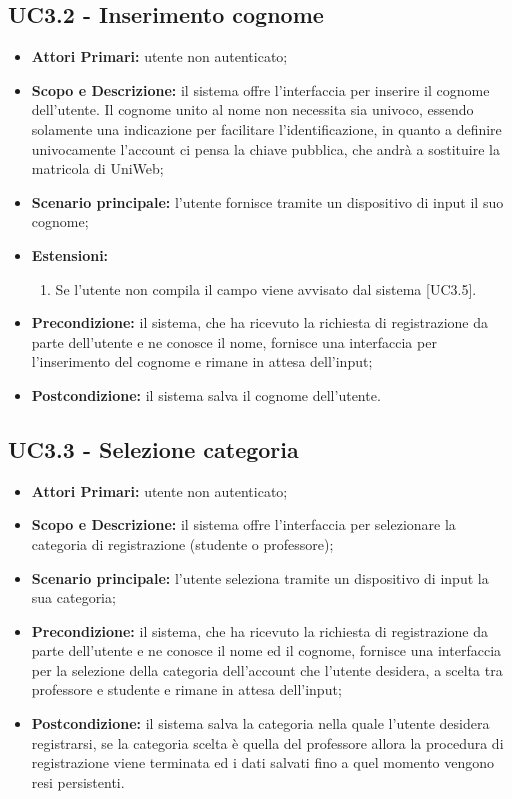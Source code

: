 \documentclass[AnalisiDeiRequisiti.tex]{subfiles}
\begin{document}
\subsection{UC3.2 - Inserimento cognome}
\begin{itemize}
	\item \textbf{Attori Primari:} utente non autenticato;
	\item \textbf{Scopo e Descrizione:} il sistema offre l'interfaccia per inserire il cognome dell'utente. Il cognome unito al nome non necessita sia univoco, essendo solamente una indicazione per facilitare l'identificazione, in quanto a definire univocamente l'account ci pensa la chiave pubblica, che andrà a sostituire la matricola di UniWeb;
	\item \textbf{Scenario principale:} l'utente fornisce tramite un dispositivo di input il suo cognome;
	\item \textbf{Estensioni:}
		\begin{enumerate}
				\item Se l'utente non compila il campo viene avvisato dal sistema [UC3.5].
		\end{enumerate}		
	\item \textbf{Precondizione:} il sistema, che ha ricevuto la richiesta di registrazione da parte dell'utente e ne conosce il nome, fornisce una interfaccia per l'inserimento del cognome e rimane in attesa dell'input;
	\item \textbf{Postcondizione:} il sistema salva il cognome dell'utente.
\end{itemize}
\subsection{UC3.3 - Selezione categoria}
\begin{itemize}
	\item \textbf{Attori Primari:} utente non autenticato;
	\item \textbf{Scopo e Descrizione:} il sistema offre l'interfaccia per selezionare la categoria di registrazione (studente o professore);
	\item \textbf{Scenario principale:} l'utente seleziona tramite un dispositivo di input la sua categoria;
	\item \textbf{Precondizione:} il sistema, che ha ricevuto la richiesta di registrazione da parte dell'utente e ne conosce il nome ed il cognome, fornisce una interfaccia per la selezione della categoria dell'account che l'utente desidera, a scelta tra professore e studente e rimane in attesa dell'input;
	\item \textbf{Postcondizione:} il sistema salva la categoria nella quale l'utente desidera registrarsi, se la categoria scelta è quella del professore allora la procedura di registrazione viene terminata ed i dati salvati fino a quel momento vengono resi persistenti.
\end{itemize}
\end{document}
